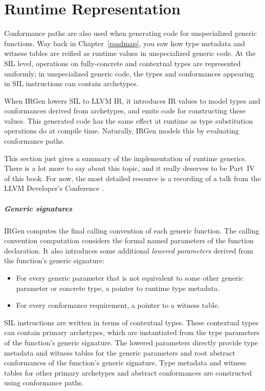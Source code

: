 \documentclass[../generics]{subfiles}
\begin{document}
\chapter{Runtime Representation}\label{runtime representation}

Conformance paths are also used when generating code for unspecialized generic functions. Way back in Chapter~\ref{roadmap}, you saw how type metadata and witness tables are reified as runtime values in unspecialized generic code. At the SIL level, operations on fully-concrete and contextual types are represented uniformly; in unspecialized generic code, the types and conformances appearing in SIL instructions can contain archetypes.

When IRGen lowers SIL to LLVM IR, it introduces IR values to model types and conformances derived from archetypes, and emits code for constructing these values. This generated code has the same effect at runtime as type substitution operations do at compile time. Naturally, IRGen models this by evaluating conformance paths.

This section just gives a summary of the implementation of runtime generics. There is a lot more to say about this topic, and it really deserves to be Part~IV of this book. For now, the most detailed resource is a recording of a talk from the LLVM Developer's Conference \cite{llvmtalk}.

\paragraph{Generic signatures}
IRGen computes the final calling convention of each generic function. The calling convention computation considers the formal named parameters of the function declaration. It also introduces some additional \emph{lowered parameters} derived from the function's generic signature:
\begin{itemize}
\item For every generic parameter that is not equivalent to some other generic parameter or concrete type, a pointer to runtime type metadata.
\item For every conformance requirement, a pointer to a witness table.
\end{itemize}
SIL instructions are written in terms of contextual types. These contextual types can contain primary archetypes, which are instantiated from the type parameters of the function's generic signature. The lowered parameters directly provide type metadata and witness tables for the generic parameters and root abstract conformances of the function's generic signature. Type metadata and witness tables for other primary archetypes and abstract conformances are constructed using conformance paths.
\end{document}
